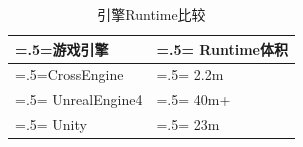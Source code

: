 \begin{table}[h!]
    \begin{center}
        \caption{引擎Runtime比较}
        \label{enginert}
        \renewcommand\arraystretch{1.5}
        \begin{tabularx}{0.8\textwidth}{ 
            | >{\centering\arraybackslash\hsize=.5\hsize\linewidth=\hsize}X 
            | >{\centering\arraybackslash\hsize=.5\hsize\linewidth=\hsize}X 
            | }
            \hline
            \textbf{游戏引擎} & \textbf{Runtime体积} \\
            \hline
            CrossEngine & 2.2m \\
            \hline
            UnrealEngine4 & 40m+\\
            \hline
            Unity & 23m\\
            \hline
        \end{tabularx}
    \end{center}
\end{table}



